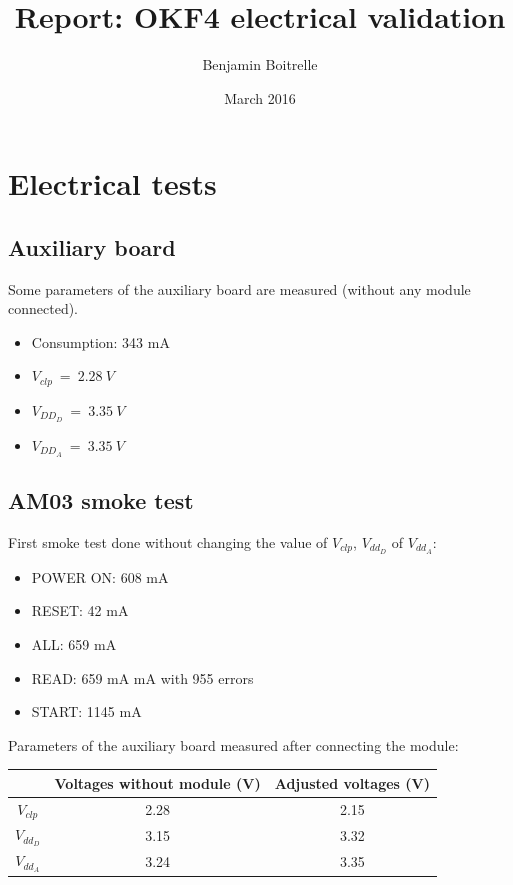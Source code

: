 \documentclass[a4papper, 10pt]{article}
\title{Report: OKF4 electrical validation}
\author{Benjamin Boitrelle}
\date{March 2016}
\begin{document}
  \maketitle
  
  
  \section{Electrical tests}
  \subsection{Auxiliary board}
  
  Some parameters of the auxiliary board are measured (without any module connected).
  \begin{itemize}
    \item Consumption: 343 mA
    \item $V_{clp} \ = \ 2.28 \ V$
    \item $V_{DD_D} \ = \ 3.35 \ V$
    \item $V_{DD_A} \ = \ 3.35 \ V$
  \end{itemize}
  
  \subsection{AM03 smoke test}
  
  First smoke test done without changing the value of  $V_{clp}$, $V_{dd_D}$ of $V_{dd_A}$:
  \begin{itemize}
    \item POWER ON: 608 mA
    \item RESET: 42 mA
    \item ALL: 659 mA
    \item READ: 659 mA mA with 955 errors 
    \item START: 1145 mA 
  \end{itemize}
  
  Parameters of the auxiliary board measured after connecting the module:
  
  \begin{center}
    \begin{tabular}{ c c c}
    \hline %
      & Voltages without module (V) & Adjusted voltages (V) \tabularnewline
    \hline %
    \hline %
    $V_{clp}$ & 2.28 & 2.15 \tabularnewline
    $V_{dd_D}$ & 3.15 & 3.32 \tabularnewline
    $V_{dd_A}$ & 3.24 & 3.35 \tabularnewline
    \end{tabular}
  \end{center}
  
\end{document}
